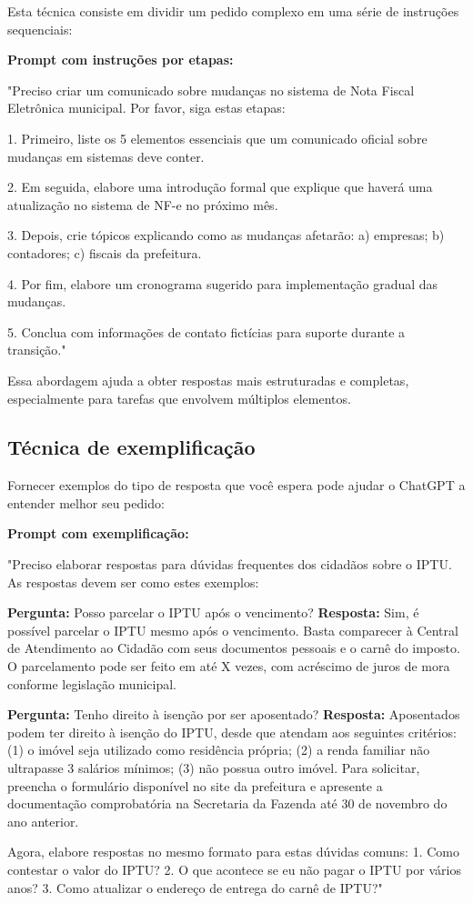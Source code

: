 \documentclass[12pt,a4paper]{book}
\begin{document}
Esta técnica consiste em dividir um pedido complexo em uma série de instruções sequenciais:

\begin{tcolorbox}[exemplo]
\textbf{Prompt com instruções por etapas:}

"Preciso criar um comunicado sobre mudanças no sistema de Nota Fiscal Eletrônica municipal. Por favor, siga estas etapas:

1. Primeiro, liste os 5 elementos essenciais que um comunicado oficial sobre mudanças em sistemas deve conter.

2. Em seguida, elabore uma introdução formal que explique que haverá uma atualização no sistema de NF-e no próximo mês.

3. Depois, crie tópicos explicando como as mudanças afetarão: a) empresas; b) contadores; c) fiscais da prefeitura.

4. Por fim, elabore um cronograma sugerido para implementação gradual das mudanças.

5. Conclua com informações de contato fictícias para suporte durante a transição."
\end{tcolorbox}

Essa abordagem ajuda a obter respostas mais estruturadas e completas, especialmente para tarefas que envolvem múltiplos elementos.

\subsection{Técnica de exemplificação}

Fornecer exemplos do tipo de resposta que você espera pode ajudar o ChatGPT a entender melhor seu pedido:

\begin{tcolorbox}[exemplo]
\textbf{Prompt com exemplificação:}

"Preciso elaborar respostas para dúvidas frequentes dos cidadãos sobre o IPTU. As respostas devem ser como estes exemplos:

\textbf{Pergunta:} Posso parcelar o IPTU após o vencimento?
\textbf{Resposta:} Sim, é possível parcelar o IPTU mesmo após o vencimento. Basta comparecer à Central de Atendimento ao Cidadão com seus documentos pessoais e o carnê do imposto. O parcelamento pode ser feito em até X vezes, com acréscimo de juros de mora conforme legislação municipal.

\textbf{Pergunta:} Tenho direito à isenção por ser aposentado?
\textbf{Resposta:} Aposentados podem ter direito à isenção do IPTU, desde que atendam aos seguintes critérios: (1) o imóvel seja utilizado como residência própria; (2) a renda familiar não ultrapasse 3 salários mínimos; (3) não possua outro imóvel. Para solicitar, preencha o formulário disponível no site da prefeitura e apresente a documentação comprobatória na Secretaria da Fazenda até 30 de novembro do ano anterior.

Agora, elabore respostas no mesmo formato para estas dúvidas comuns:
1. Como contestar o valor do IPTU?
2. O que acontece se eu não pagar o IPTU por vários anos?
3. Como atualizar o endereço de entrega do carnê de IPTU?"
\end{tcolorbox}
\end{document}
